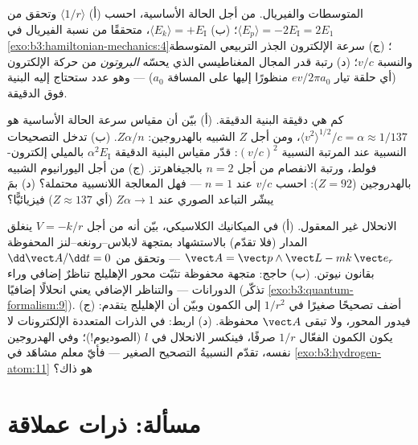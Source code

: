 \begin{exercise}[$\star\star\star$]\label{exo:b3:hydrogen-atom:10}
المتوسطات والفيريال. من أجل الحالة الأساسية، احسب (أ)
$\langle 1/r\rangle$ وتحقق من $\langle E_p\rangle = -2E_{\text{I}}
= 2E_1$؛ (ب) $\langle E_k\rangle = +E_{\text{I}}$، متحققًا من
نسبة الفيريال في \cref{exo:b3:hamiltonian-mechanics:4}؛ (ج)
سرعة الإلكترون الجذر التربيعي المتوسطة والنسبة $v/c$؛ (د) رتبة قدر المجال المغناطيسي الذي يحسّه
\emph{البروتون} من حركة الإلكترون (أي حلقة تيار
$ev/2\pi a_0$ منظورًا إليها على المسافة $a_0$) --- وهو عدد ستحتاج إليه
البنية فوق الدقيقة.
\end{exercise}

\begin{exercise}[$\star\star\star$]\label{exo:b3:hydrogen-atom:11}
كم هي دقيقة البنية الدقيقة. (أ) بيّن أن مقياس سرعة الحالة
الأساسية هو $\langle v^2\rangle^{1/2}/c = \alpha \approx 1/137$، ومن أجل
$Z$ الشبيه بالهدروجين: $Z\alpha/n$. (ب) تدخل التصحيحات النسبية
عند المرتبة النسبية $(v/c)^2$: قدّر مقياس البنية الدقيقة
$\alpha^2E_{\text{I}}$ بالميلي إلكترون-فولط، ورتبة الانفصام من أجل
$n = 2$ بالجيغاهرتز. (ج) من أجل اليورانيوم الشبيه بالهدروجين ($Z = 92$): احسب $v/c$ عند
$n = 1$ --- فهل المعالجة اللانسبية محتملة؟ (د) بمَ
يبشّر التباعد الصوري عند $Z\alpha \to 1$ (أي $Z \approx 137$)
فيزيائيًّا؟
\end{exercise}

\begin{exercise}[$\star\star\star$]\label{exo:b3:hydrogen-atom:12}
الانحلال غير المعقول. (أ) في الميكانيك الكلاسيكي، بيّن أنه
من أجل $V = -k/r$ ينغلق المدار (فلا تقدّم) بالاستشهاد
بمتجهة لابلاس--رونغه--لنز المحفوظة $\vect A = \vect p\wedge\vect
L - mk\,\vect e_r$ --- وتحقق من $\dd\vect A/\dd t = 0$ بقانون
نيوتن. (ب) حاجج: متجهة محفوظة تثبّت محور الإهليلج تناظرٌ
إضافي وراء الدورانات --- والتناظر الإضافي يعني انحلالًا
إضافيًا (تذكّر \cref{exo:b3:quantum-formalism:9}). (ج) أضف
تصحيحًا صغيرًا في $1/r^2$ إلى الكمون وبيّن أن الإهليلج
يتقدم: فيدور المحور، ولا تبقى $\vect A$ محفوظة. (د)
اربط: في الذرات المتعددة الإلكترونات لا يكون الكمون الفعّال
$1/r$ صرفًا، فينكسر الانحلال في $l$ (الصوديوم!)؛ وفي الهدروجين
نفسه، تقدّم النسبيةُ التصحيح الصغير --- فأيّ
معلم مشاهَد في \cref{exo:b3:hydrogen-atom:11} هو ذاك؟
\end{exercise}

\section{مسألة: ذرات عملاقة}

